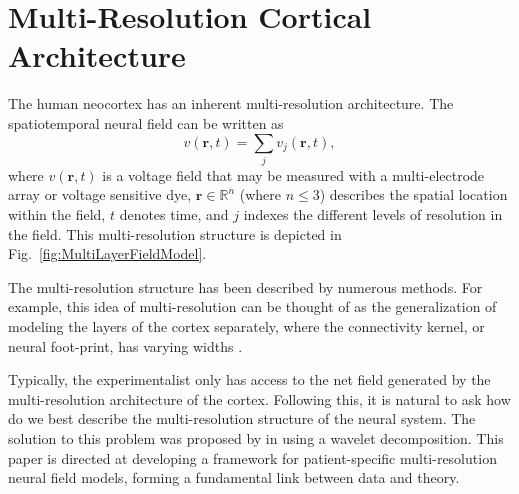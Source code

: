 \documentclass[review,authoryear,3p]{elsarticle}
\begin{document}
\section{Multi-Resolution Cortical Architecture}
The human neocortex has an inherent multi-resolution architecture. The spatiotemporal neural field can be written as 
\begin{equation}
	v\left(\mathbf{r},t\right) = \sum_{j} v_j\left(\mathbf{r},t\right),
\end{equation}
where $v\left(\mathbf{r},t\right)$ is a voltage field that may be measured with a multi-electrode array or voltage sensitive dye, $\mathbf{r}\in \mathbb{R}^n$ (where $n\le3$) describes the spatial location within the field, $t$ denotes time, and $j$ indexes the different levels of resolution in the field. This multi-resolution structure is depicted in Fig.~\ref{fig:MultiLayerFieldModel}.

The multi-resolution structure has been described by numerous methods. For example, this idea of multi-resolution can be thought of as the generalization of modeling the layers of the cortex separately, where the connectivity kernel, or neural foot-print, has varying widths \citep{Wilson1973}.

Typically, the experimentalist only has access to the net field generated by the multi-resolution architecture of the cortex. Following this, it is natural to ask how do we best describe the multi-resolution structure of the neural system. The solution to this problem was proposed by \citet{Breakspear2005} in using a wavelet decomposition. This paper is directed at developing a framework for patient-specific multi-resolution neural field models, forming a fundamental link between data and theory. 
\end{document}
